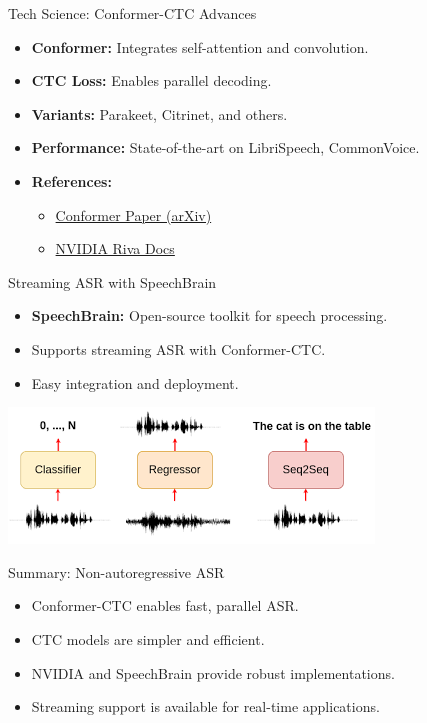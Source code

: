 \begin{frame}{Tech Science: Conformer-CTC Advances}
    \begin{itemize}
        \setlength{\itemsep}{1.5em}
        \item \textbf{Conformer:} Integrates self-attention and convolution.
        \item \textbf{CTC Loss:} Enables parallel decoding.
        \item \textbf{Variants:} Parakeet, Citrinet, and others.
        \item \textbf{Performance:} State-of-the-art on LibriSpeech, CommonVoice.
        \item \textbf{References:}
        \begin{itemize}
            \item \href{https://arxiv.org/abs/2005.08100}{Conformer Paper (arXiv)}
            \item \href{https://docs.nvidia.com/deeplearning/riva/user-guide/docs/reference/models/asr.html}{NVIDIA Riva Docs}
        \end{itemize}
    \end{itemize}
\end{frame}

\begin{frame}{Streaming ASR with SpeechBrain}
    \begin{itemize}
        \item \textbf{SpeechBrain:} Open-source toolkit for speech processing.
        \item Supports streaming ASR with Conformer-CTC.
        \item Easy integration and deployment.
    \end{itemize}
    \begin{center}
        \includegraphics[width=\textwidth]{images/audio-nlp/speechbrain-streaming.png}
    \end{center}
\end{frame}

\begin{frame}{Summary: Non-autoregressive ASR}
    \begin{itemize}
        \setlength{\itemsep}{1.5em}
        \item Conformer-CTC enables fast, parallel ASR.
        \item CTC models are simpler and efficient.
        \item NVIDIA and SpeechBrain provide robust implementations.
        \item Streaming support is available for real-time applications.
    \end{itemize}
\end{frame}